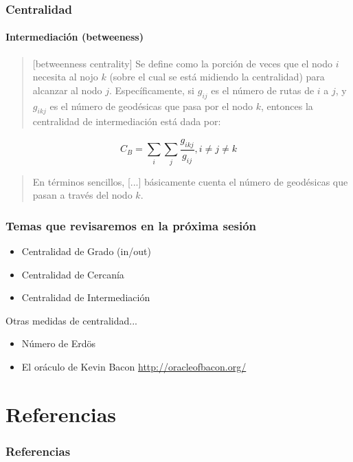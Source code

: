 \documentclass[10pt]{beamer}
\begin{document}
\begin{frame}
\frametitle{Centralidad}
\framesubtitle{Intermediaci\'on (betweeness)}

\begin{quote}
[betweenness centrality] Se define como la porci\'on de veces que el nodo $i$ necesita al nojo $k$ (sobre
el cual se est\'a midiendo la centralidad) para alcanzar al nodo $j$.
Espec\'ificamente, si $g_{ij}$ es el n\'umero de rutas de $i$ a $j$, y $g_{ikj}$
es el n\'umero de geod\'esicas que pasa por el nodo $k$, entonces la centralidad
de intermediaci\'on est\'a dada por: 
\end{quote}

\begin{equation}
C_B=\sum_i\sum_j{\frac{g_{ikj}}{g_{ij}}}, i \neq j \neq k
\end{equation}

\begin{quote}
En t\'erminos sencillos, [...] b\'asicamente cuenta el n\'umero de geod\'esicas
que pasan a trav\'es del nodo $k$. \cite{borgatti2005centrality}
\end{quote}
\end{frame}

\begin{frame}
\frametitle{Temas que revisaremos en la pr\'oxima sesi\'on}
\begin{itemize}
\item Centralidad de Grado (in/out)
\item Centralidad de Cercan\'ia
\item Centralidad de Intermediaci\'on
\end{itemize}
Otras medidas de centralidad...
\begin{itemize}
\item N\'umero de Erd{\"o}s 
\item El or\'aculo de Kevin Bacon \url{http://oracleofbacon.org/}
\end{itemize}
\end{frame}

\section{Referencias}
\begin{frame}
\frametitle{Referencias}


\end{frame}
\end{document}
